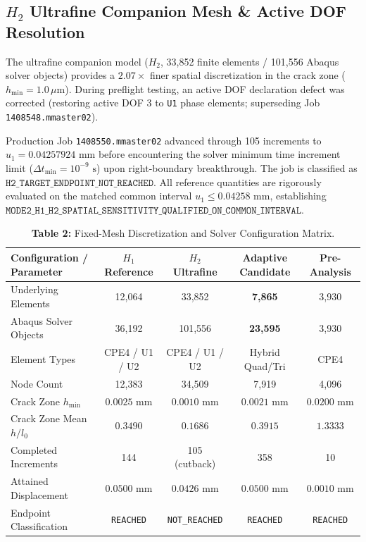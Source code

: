 \documentclass[11pt,a4paper]{article}
\begin{document}
\subsection{\texorpdfstring{$H_2$}{H2} Ultrafine Companion Mesh \& Active DOF Resolution}
The ultrafine companion model ($H_2$, 33,852 finite elements / 101,556 Abaqus solver objects) provides a $2.07\times$ finer spatial discretization in the crack zone ($h_{\min} = 1.0\,\mu\text{m}$). During preflight testing, an active DOF declaration defect was corrected (restoring active DOF 3 to \texttt{U1} phase elements; superseding Job \texttt{1408548.mmaster02}). 

Production Job \texttt{1408550.mmaster02} advanced through 105 increments to $u_1 = 0.04257924\text{ mm}$ before encountering the solver minimum time increment limit ($\Delta t_{\min} = 10^{-9}\text{ s}$) upon right-boundary breakthrough. The job is classified as $\mathtt{H2\_TARGET\_ENDPOINT\_NOT\_REACHED}$. All reference quantities are rigorously evaluated on the matched common interval $u_1 \le 0.04258\text{ mm}$, establishing $\mathtt{MODE2\_H1\_H2\_SPATIAL\_SENSITIVITY\_QUALIFIED\_ON\_COMMON\_INTERVAL}$.

\begin{table}[htbp]
\centering
\small
\caption{\textbf{Table 2:} Fixed-Mesh Discretization and Solver Configuration Matrix.}
\label{tab:mesh_config}
\begin{tabular}{lcccc}
\toprule
\textbf{Configuration / Parameter} & \textbf{$H_1$ Reference} & \textbf{$H_2$ Ultrafine} & \textbf{Adaptive Candidate} & \textbf{Pre-Analysis} \\
\midrule
Underlying Elements & 12,064 & 33,852 & \textbf{7,865} & 3,930 \\
Abaqus Solver Objects & 36,192 & 101,556 & \textbf{23,595} & 3,930 \\
Element Types & CPE4 / U1 / U2 & CPE4 / U1 / U2 & Hybrid Quad/Tri & CPE4 \\
Node Count & 12,383 & 34,509 & 7,919 & 4,096 \\
Crack Zone $h_{\min}$ & $0.0025\text{ mm}$ & $0.0010\text{ mm}$ & $0.0021\text{ mm}$ & $0.0200\text{ mm}$ \\
Crack Zone Mean $h/l_0$ & $0.3490$ & $0.1686$ & $0.3915$ & $1.3333$ \\
Completed Increments & 144 & 105 (cutback) & 358 & 10 \\
Attained Displacement & $0.0500\text{ mm}$ & $0.0426\text{ mm}$ & $0.0500\text{ mm}$ & $0.0010\text{ mm}$ \\
Endpoint Classification & \texttt{REACHED} & \texttt{NOT\_REACHED} & \texttt{REACHED} & \texttt{REACHED} \\
\bottomrule
\end{tabular}
\end{table}
\end{document}
